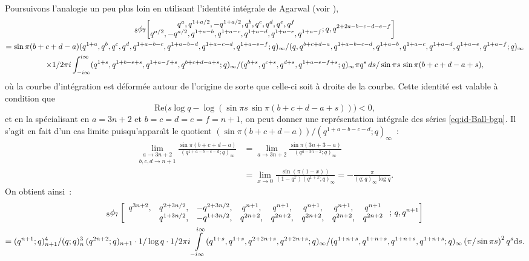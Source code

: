 \documentclass[12pt]{amsart}
\newcommand{\io}{\infty}
\newcommand{\dd}{\textup{d}}
\theoremstyle{remark}
\numberwithin{equation}{section}
\begin{document}
Poursuivons l'analogie un peu plus loin en utilisant l'identit{\'e} 
int{\'e}grale de Agarwal (voir 
\cite[(4.6.5)]{gr}), 
\begin{multline*} 
 {} _{8} \phi _{7} \! \left [                \begin{matrix} \let \over /
    \def\frac#1#2{#1 / #2} q^a, q^{1+a/2}, -q^{1+a/2} 
    , q^b,q^ c, q^d, q^e, q^f\\ \let \over / \def\frac#1#2{#1 / #2}q^{a/2},
    -q^{a/2}, q^{1+a-b}, q^{1+a-c}, q^{1+a-d},
    q^{1+a-e},q^{1+a-f}\end{matrix} ;q, {\displaystyle
    q^{2+2a-b-c-d-e-f}} \right ] \\=
\sin\pi(b+c+d-a)
\frac
{(q^{1+a},q^b,q^c,q^d,q^{1+a-b-c},q^{1+a-b-d},q^{1+a-c-d},
 q^{1+a-e-f};q)_\infty} {(q,q^{b+c+d-a},q^{1+a-b-c-d},q^{1+a-b},
 q^{1+a-c},q^{1+a-d},q^{1+a-e},q^{1+a-f};q)_\infty}\\
\times\frac {1} {2\pi i}\int _{-i\infty} ^{i\infty}
\frac {(q^{1+s},q^{1+b-e+s},q^{1+a-f+s},q^{b+c+d-a+s};q)_\infty} 
{(q^{b+s},q^{c+s},q^{d+s},q^{1+a-e-f+s};q)_\infty}
\frac {\pi q^s\,ds} {\sin\pi s\,\sin\pi(b+c+d-a+s)},
\end{multline*}
o{\`u} la courbe d'int{\'e}gration est d{\'e}form{\'e}e autour de l'origine de sorte que
celle-ci soit {\`a} droite de la courbe. Cette identit{\'e} est  
 valable {\`a} condition que
$$\text{Re}\bigl(s\log q-\log(\sin\pi s\,\sin\pi(b+c+d-a+s))\bigr)<0,$$ 
et en  la sp{\'e}cia\-li\-sant en  
$a=3n+2$ et $b=c=d=e=f=n+1$, on peut donner une repr{\'e}sentation 
int{\'e}grale des
s{\'e}ries \eqref{eq:id-Ball-bgn}. 
Il s'agit en fait d'un cas limite 
puisqu'appara{\^\i}t le quotient 
$(\sin\pi(b+c+d-a))/(q^{1+a-b-c-d};q)_{\io}$~:
\begin{align*}
\underset{b,c,d\to n+1}{\lim_{a\to 3n+2}}\frac {\sin\pi(b+c+d-a)} 
{(q^{1+a-b-c-d};q)_{\io}}&=\lim_{a\to 3n+2}\frac {\sin\pi(3n+3-a)} 
{(q^{a-3n-2};q)_{\io}}\\
&=\lim_{x\to 0}\frac{\sin(\pi(1-x))}
{(1-q^x)(q^{1+x};q)_{\io}}=-\frac{\pi}{(q;q)_{\io}\log q}.
\end{align*}
On obtient ainsi~:
\begin{multline*}
{}_8 \phi_7 \left[
      \begin{array}{cccccccc}
      q^{3n+2} ,& q^{2+3n/2},& -q^{2+3n/2},& q^{n+1}, & q^{n+1}, & q^{n+1},& q^{n+1}, & q^{n+1}\\
                & q^{1+3n/2},& -q^{1+3n/2},& q^{2n+2},& q^{2n+2},& q^{2n+2},& q^{2n+2},& q^{2n+2} 
      \end{array}\; ;\,  q , q^{n+1} \right ]\\
=
\frac {(q^{n+1};q)_{n+1}^4} 
{(q;q)_n^3\,(q^{2n+2};q)_{n+1}}
\cdot \frac{1}{\log q}\cdot\frac{1}{2\pi i} \int\limits_{-i\io}^{i\io}
\frac
{(q^{1+s},q^{1+s},q^{2+2n+s},q^{2+2n+s}; q)_{\io}}
{(q^{1+n+s}, q^{1+n+s}, q^{1+n+s}, q^{1+n+s}; q)_{\io}}
\left(\frac{\pi}{\sin\pi s}\right)^2 q^s \dd s.
\label{eq:agarw}
\end{multline*}
\end{document}
